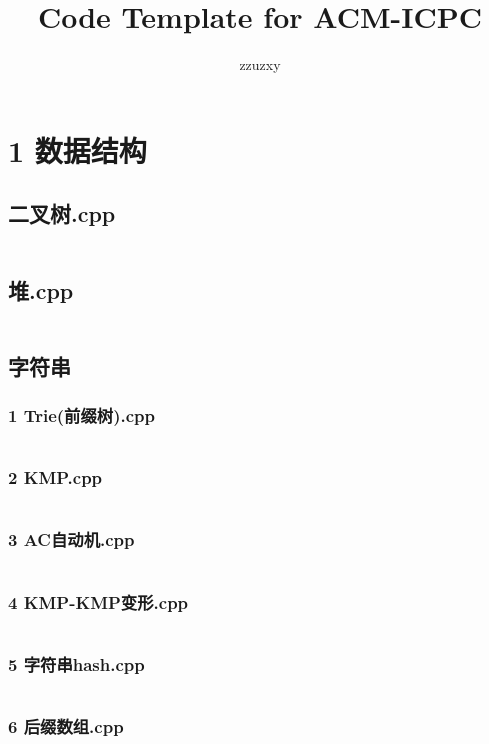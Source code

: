 \documentclass{article}
\title{Code Template for ACM-ICPC}
\author{zzuzxy}
\begin{document}
\begin{titlepage}
\maketitle
\thispagestyle{empty}
\pagebreak
\pagestyle{plain}
\tableofcontents
\end{titlepage}
\section{1 数据结构}
\subsection{二叉树.cpp}
\inputminted{c++}{/home/zzuzxy/t2/Template1.0/1 数据结构/二叉搜索树/二叉树.cpp}
\subsection{堆.cpp}
\inputminted{c++}{/home/zzuzxy/t2/Template1.0/1 数据结构/基础数据结构/堆.cpp}
\subsection{字符串}
\subsubsection{1 Trie(前缀树).cpp}
\inputminted{c++}{/home/zzuzxy/t2/Template1.0/1 数据结构/字符串/1 Trie(前缀树).cpp}
\subsubsection{2 KMP.cpp}
\inputminted{c++}{/home/zzuzxy/t2/Template1.0/1 数据结构/字符串/2 KMP.cpp}
\subsubsection{3 AC自动机.cpp}
\inputminted{c++}{/home/zzuzxy/t2/Template1.0/1 数据结构/字符串/3 AC自动机.cpp}
\subsubsection{4 KMP-KMP变形.cpp}
\inputminted{c++}{/home/zzuzxy/t2/Template1.0/1 数据结构/字符串/4 KMP-KMP变形.cpp}
\subsubsection{5 字符串hash.cpp}
\inputminted{c++}{/home/zzuzxy/t2/Template1.0/1 数据结构/字符串/5 字符串hash.cpp}
\subsubsection{6 后缀数组.cpp}
\inputminted{c++}{/home/zzuzxy/t2/Template1.0/1 数据结构/字符串/6 后缀数组.cpp}
\end{document}
